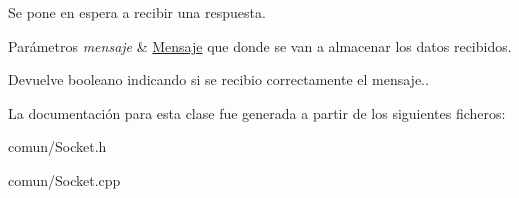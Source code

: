 \-Se pone en espera a recibir una respuesta. 


\begin{DoxyParams}{\-Parámetros}
{\em mensaje} & \hyperlink{classMensaje}{\-Mensaje} que donde se van a almacenar los datos recibidos. \\
\hline
\end{DoxyParams}
\begin{DoxyReturn}{\-Devuelve}
booleano indicando si se recibio correctamente el mensaje.. 
\end{DoxyReturn}


\-La documentación para esta clase fue generada a partir de los siguientes ficheros\-:\begin{DoxyCompactItemize}
\item 
comun/\-Socket.\-h\item 
comun/\-Socket.\-cpp\end{DoxyCompactItemize}
